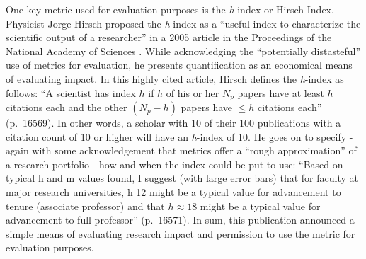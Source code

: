 \documentclass[
  10pt,
  letterpaper,
]{article}
\begin{document}
One key metric used for evaluation purposes is the \emph{h}-index or
Hirsch Index. Physicist Jorge Hirsch proposed the \emph{h}-index as a
``useful index to characterize the scientific output of a researcher''
in a 2005 article in the Proceedings of the National Academy of Sciences
\citep{hirsch_index_2005}. While acknowledging the ``potentially
distasteful'' use of metrics for evaluation, he presents quantification
as an economical means of evaluating impact. In this highly cited
article, Hirsch defines the \emph{h}-index as follows: ``A scientist has
index \(h\) if \(h\) of his or her \(N_p\) papers have at least \(h\)
citations each and the other \((N_p-h)\) papers have \(\le h\) citations
each'' (p.~16569). In other words, a scholar with 10 of their 100
publications with a citation count of 10 or higher will have an
\emph{h}-index of 10. He goes on to specify - again with some
acknowledgement that metrics offer a ``rough approximation'' of a
research portfolio - how and when the index could be put to use: ``Based
on typical h and m values found, I suggest (with large error bars) that
for faculty at major research universities, h 12 might be a typical
value for advancement to tenure (associate professor) and that
\(h \approx 18\) might be a typical value for advancement to full
professor'' (p.~16571). In sum, this publication announced a simple
means of evaluating research impact and permission to use the metric for
evaluation purposes.
\end{document}
